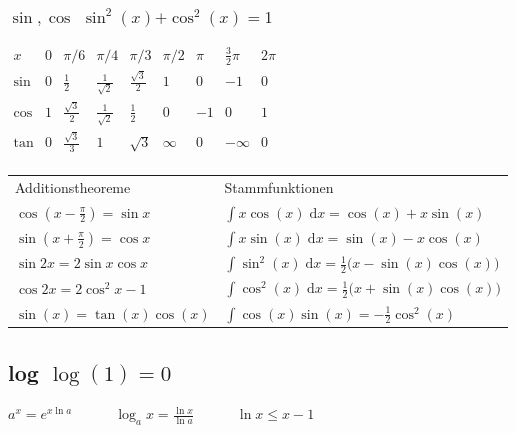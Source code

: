 \documentclass[6pt,a4paper]{scrartcl}
\newcommand{\bs}[1]{\ensuremath{\boldsymbol{#1}}}                              %
\newcommand{\diff}{\ensuremath{\;\mathrm d}}                                   %
\begin{document}
\begin{multicols*}{4}

    \subsubsection{$\sin,\cos$ \quad $\sin^2(x) \bs + \cos^2(x) = 1$}
    $\begin{array}{c|c|c|c|c|c|c|c|c}
            x    & 0 & \pi / 6            & \pi / 4            & \pi / 3           & \pi / 2 & \pi & \frac{3}{2}\pi & 2 \pi \\ \hline
            \sin & 0 & \frac{1}{2}        & \frac{1}{\sqrt{2}} & \frac{\sqrt 3}{2} & 1       & 0   & -1             & 0     \\
            \cos & 1 & \frac{\sqrt 3}{2}  & \frac{1}{\sqrt 2}  & \frac{1}{2}       & 0       & -1  & 0              & 1     \\
            \tan & 0 & \frac{\sqrt{3}}{3} & 1                  & \sqrt{3}          & \infty  & 0   & - \infty       & 0     \\
        \end{array}$
    \begin{tabular}{l  l}
        Additionstheoreme                   & Stammfunktionen                                                    \\
        $\cos (x - \frac{\pi}{2}) = \sin x$ & $\int x \cos(x) \diff x = \cos(x) + x \sin(x)$                     \\

        $\sin (x + \frac{\pi}{2}) = \cos x$ & $\int x \sin(x) \diff x = \sin(x) - x \cos(x)$                     \\

        $\sin 2x = 2 \sin x \cos x $        & $\int \sin^2(x) \diff x = \frac12 \bigl(x - \sin(x)\cos(x) \bigr)$ \\

        $\cos 2x = 2\cos^2 x - 1$           & $\int \cos^2(x) \diff x = \frac12 \bigl(x + \sin(x)\cos(x) \bigr)$ \\

        $\sin(x) = \tan(x)\cos(x)$          & $\int \cos(x)\sin(x) = -\frac12 \cos^2(x)$                         \\
    \end{tabular}

    \subsection{log \quad $\log(1) = 0$}
    $a^x = e^{x \ln a} \qquad \quad \log_a x = \frac{\ln x}{\ln a} \qquad \quad \ln x \le x -1$


\end{multicols*}
\end{document}
